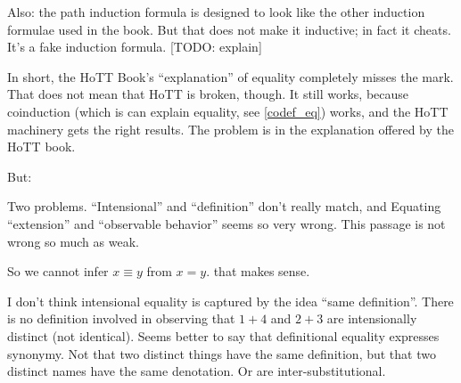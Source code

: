 \documentclass{article}
\begin{document}
Also: the path induction formula is designed to look like the other
induction formulae used in the book. But that does not make it
inductive; in fact it cheats. It's a fake induction formula. [TODO:
  explain]

In short, the HoTT Book's ``explanation'' of equality completely
misses the mark. That does not mean that HoTT is broken, though. It
still works, because coinduction (which is can explain equality, see
\ref{codef_eq}) works, and the HoTT machinery gets the right results.
The problem is in the explanation offered by the HoTT book.

But:


Two problems. ``Intensional'' and ``definition'' don't really match,
and Equating ``extension'' and ``observable behavior'' seems so very
wrong.  This passage is not wrong so much as weak.


So we cannot infer \(x ≡ y\) from \(x = y\). that makes sense.

I don't think intensional equality is captured by the idea ``same
definition''. There is no definition involved in observing that
\(1+4\) and \(2+3\) are intensionally distinct (not identical). Seems
better to say that definitional equality expresses synonymy. Not that
two distinct things have the same definition, but that two distinct
names have the same denotation. Or are inter-substitutional.
\end{document}
